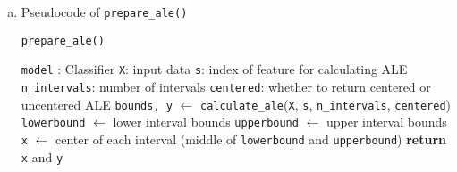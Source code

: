 {\begin{enumerate}[a)]
%

\item Pseudocode of  \texttt{prepare\_ale()}

\begin{algorithm}[ht]
\caption{\texttt{prepare\_ale()}}
\begin{algorithmic}[1]
\Require \texttt{model} : Classifier 
\Require \texttt{X}: input data 
\Require \texttt{s}: index of feature for calculating ALE
\Require \texttt{n\_intervals}: number of intervals 
\Require \texttt{centered}: whether to return centered or uncentered ALE
\State \texttt{bounds, y} $\gets$ \texttt{calculate\_ale}(\texttt{X}, \texttt{s}, \texttt{n\_intervals}, \texttt{centered})
\State \texttt{lowerbound} $\gets$ lower interval bounds
\State \texttt{upperbound} $\gets$ upper interval bounds
\State \texttt{x} $\gets$ center of each interval (middle of \texttt{lowerbound} and \texttt{upperbound})
\State \textbf{return}  \texttt{x} and \texttt{y}
\end{algorithmic}
\end{algorithm}

%

%


\end{enumerate}
}